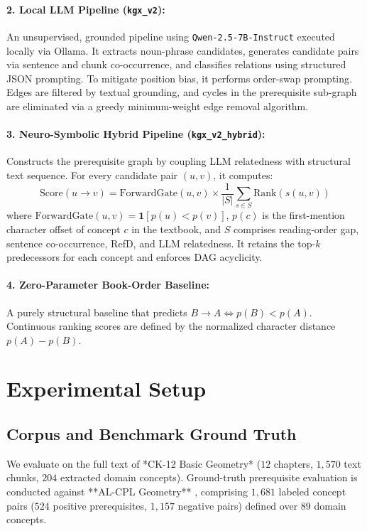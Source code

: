 \documentclass[11pt,a4paper]{article}
\begin{document}
\paragraph{2. Local LLM Pipeline (\texttt{kgx\_v2}):}
An unsupervised, grounded pipeline using \texttt{Qwen-2.5-7B-Instruct} executed locally via Ollama. It extracts noun-phrase candidates, generates candidate pairs via sentence and chunk co-occurrence, and classifies relations using structured JSON prompting. To mitigate position bias, it performs order-swap prompting. Edges are filtered by textual grounding, and cycles in the prerequisite sub-graph are eliminated via a greedy minimum-weight edge removal algorithm.

\paragraph{3. Neuro-Symbolic Hybrid Pipeline (\texttt{kgx\_v2\_hybrid}):}
Constructs the prerequisite graph by coupling LLM relatedness with structural text sequence. For every candidate pair $(u, v)$, it computes:
\begin{equation}
\text{Score}(u \to v) = \text{ForwardGate}(u, v) \times \frac{1}{|S|} \sum_{s \in S} \text{Rank}(s(u, v))
\end{equation}
where $\text{ForwardGate}(u, v) = \mathbf{1}[p(u) < p(v)]$, $p(c)$ is the first-mention character offset of concept $c$ in the textbook, and $S$ comprises reading-order gap, sentence co-occurrence, RefD, and LLM relatedness. It retains the top-$k$ predecessors for each concept and enforces DAG acyclicity.

\paragraph{4. Zero-Parameter Book-Order Baseline:}
A purely structural baseline that predicts $B \to A \iff p(B) < p(A)$. Continuous ranking scores are defined by the normalized character distance $p(A) - p(B)$.

\section{Experimental Setup}

\subsection{Corpus and Benchmark Ground Truth}
We evaluate on the full text of *CK-12 Basic Geometry* ($12$ chapters, $1,570$ text chunks, $204$ extracted domain concepts). Ground-truth prerequisite evaluation is conducted against **AL-CPL Geometry** \cite{liang2015prereq}, comprising $1,681$ labeled concept pairs ($524$ positive prerequisites, $1,157$ negative pairs) defined over $89$ domain concepts.
\end{document}
